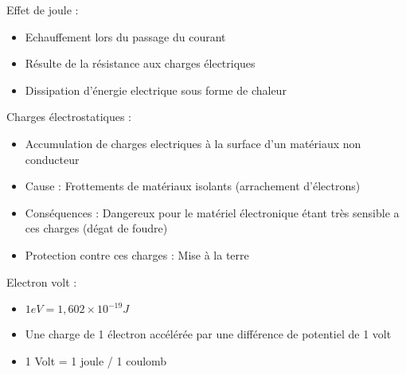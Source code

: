 \documentclass[a4paper]{article}
\begin{document}
\vspace{0.5cm}
Effet de joule :
\begin{itemize}
    \item Echauffement lors du passage du courant 
    \item Résulte de la résistance aux charges électriques
    \item Dissipation d'énergie electrique sous forme de chaleur
\end{itemize}

\vspace{0.5cm}
Charges électrostatiques :
\begin{itemize}
    \item Accumulation de charges electriques à la surface d'un matériaux non conducteur
    \item Cause : Frottements de matériaux isolants (arrachement d'électrons)
    \item Conséquences : Dangereux pour le matériel électronique étant très sensible a ces charges (dégat de foudre)
    \item Protection contre ces charges : Mise à la terre
\end{itemize}

\vspace{0.5cm}
Electron volt :
\begin{itemize}
    \item $1 eV = 1,602 \times 10^{-19} J$
    \item Une charge de 1 électron accélérée par une différence de potentiel de 1 volt
    \item 1 Volt = 1 joule / 1 coulomb
\end{itemize}
\end{document}
